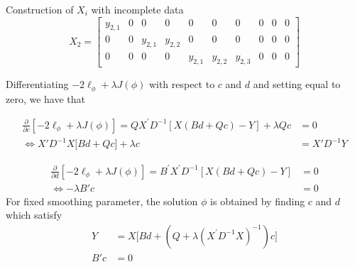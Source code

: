 \begin{example}{Construction of $X_i$ with incomplete data}
\begin{equation}
X_2 =  \begin{bmatrix} 
y_{2, 1}  & 	0  &	  0           &    0            &    0   & 0 & 0 & 0 & 0 & 0  \\
0   	      &  	0  &	y_{2, 1}  &    y_{2,2}   &    0   &  0 & 0 & 0 & 0 & 0 \\
 0   	      &        0  &    0           &    0            &  y_{2, 1}    & y_{2, 2}& y_{2, 3} &    0   & 0  & 0
\end{bmatrix}
\end{equation}
\end{example}


Differentiating $-2\ell_\phi + \lambda J\left(\phi\right)$ with respect to $c$ and $d$ and setting equal to zero, we have that 

\begin{align}
\frac{\partial}{\partial c}\left[-2\ell_\phi + \lambda J\left(\phi\right)\right] = Q X^\prime D^{-1}\left[ X\left(Bd + Qc\right) - Y  \right] + \lambda Qc &= 0 \nonumber \\
\iff    X'D^{-1} X \bigg[ Bd + Qc \bigg] + \lambda c  &= X' D^{-1}Y \label{eq:normal-eq-1}
\end{align}

\begin{align}
\frac{\partial}{\partial d}\left[-2\ell_\phi + \lambda J\left(\phi\right)\right] = B^\prime X^\prime D^{-1}\left[ X\left(Bd + Qc\right) - Y  \right] &=0 \nonumber \\
\iff   - \lambda B' c  &= 0  
\end{align}
\bigskip
\noindent
For fixed smoothing parameter, the solution $\phi$ is obtained by finding $c$ and $d$ which satisfy
\begin{align} 
Y &= X \bigg[ Bd + \left(Q  + \lambda \left(X^\prime D^{-1} X \right)^{-1} \right) c \bigg] \label{eq:ssanova-normal-eq-1} \\
B' c  &= 0  \label{eq:ssanova-normal-eq-2}
\end{align}
\noindent






